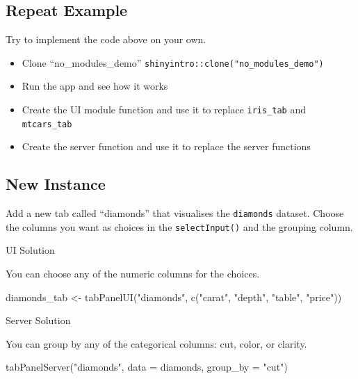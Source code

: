 \documentclass[
  oneside]{book}
\newenvironment{Shaded}{\begin{snugshade}}{\end{snugshade}}
\newcommand{\AttributeTok}[1]{\textcolor[rgb]{0.77,0.63,0.00}{#1}}
\newcommand{\FunctionTok}[1]{\textcolor[rgb]{0.00,0.00,0.00}{#1}}
\newcommand{\NormalTok}[1]{#1}
\newcommand{\OtherTok}[1]{\textcolor[rgb]{0.56,0.35,0.01}{#1}}
\newcommand{\StringTok}[1]{\textcolor[rgb]{0.31,0.60,0.02}{#1}}
\providecommand{\tightlist}{%
  \setlength{\itemsep}{0pt}\setlength{\parskip}{0pt}}
\begin{document}
\hypertarget{repeat-example}{%
\subsection*{Repeat Example}\label{repeat-example}}

Try to implement the code above on your own.

\begin{itemize}
\tightlist
\item
  Clone ``no\_modules\_demo'' \texttt{shinyintro::clone("no\_modules\_demo")}
\item
  Run the app and see how it works
\item
  Create the UI module function and use it to replace \texttt{iris\_tab} and \texttt{mtcars\_tab}
\item
  Create the server function and use it to replace the server functions
\end{itemize}

\hypertarget{new-instance}{%
\subsection*{New Instance}\label{new-instance}}

Add a new tab called ``diamonds'' that visualises the \texttt{diamonds} dataset. Choose the columns you want as choices in the \texttt{selectInput}\texttt{()} and the grouping column.

UI Solution

You can choose any of the numeric columns for the choices.

\begin{Shaded}
\begin{Highlighting}[]
\NormalTok{diamonds\_tab }\OtherTok{\textless{}{-}} \FunctionTok{tabPanelUI}\NormalTok{(}\StringTok{"diamonds"}\NormalTok{, }\FunctionTok{c}\NormalTok{(}\StringTok{"carat"}\NormalTok{, }\StringTok{"depth"}\NormalTok{, }\StringTok{"table"}\NormalTok{, }\StringTok{"price"}\NormalTok{))}
\end{Highlighting}
\end{Shaded}

Server Solution

You can group by any of the categorical columns: cut, color, or clarity.

\begin{Shaded}
\begin{Highlighting}[]
\FunctionTok{tabPanelServer}\NormalTok{(}\StringTok{"diamonds"}\NormalTok{, }\AttributeTok{data =}\NormalTok{ diamonds, }\AttributeTok{group\_by =} \StringTok{"cut"}\NormalTok{)}
\end{Highlighting}
\end{Shaded}
\end{document}
